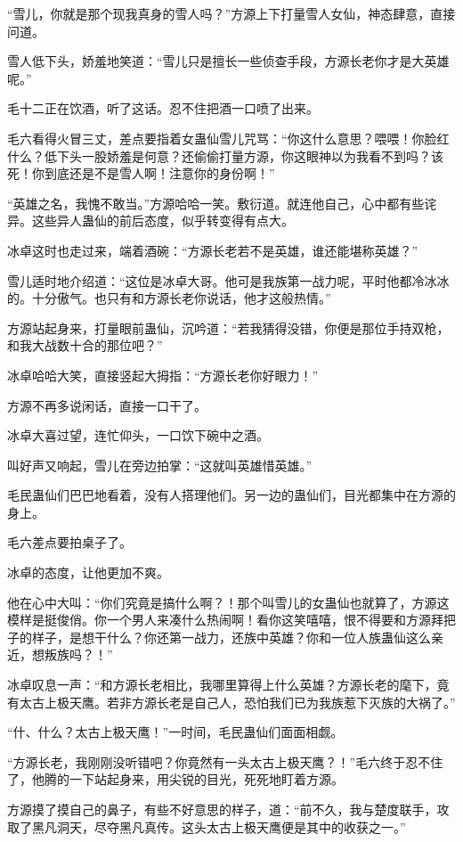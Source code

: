 \begin{this_body}
“雪儿，你就是那个现我真身的雪人吗？”方源上下打量雪人女仙，神态肆意，直接问道。

雪人低下头，娇羞地笑道：“雪儿只是擅长一些侦查手段，方源长老你才是大英雄呢。”

毛十二正在饮酒，听了这话。忍不住把酒一口喷了出来。

毛六看得火冒三丈，差点要指着女蛊仙雪儿咒骂：“你这什么意思？喂喂！你脸红什么？低下头一股娇羞是何意？还偷偷打量方源，你这眼神以为我看不到吗？该死！你到底还是不是雪人啊！注意你的身份啊！”

“英雄之名，我愧不敢当。”方源哈哈一笑。敷衍道。就连他自己，心中都有些诧异。这些异人蛊仙的前后态度，似乎转变得有点大。

冰卓这时也走过来，端着酒碗：“方源长老若不是英雄，谁还能堪称英雄？”

雪儿适时地介绍道：“这位是冰卓大哥。他可是我族第一战力呢，平时他都冷冰冰的。十分傲气。也只有和方源长老你说话，他才这般热情。”

方源站起身来，打量眼前蛊仙，沉吟道：“若我猜得没错，你便是那位手持双枪，和我大战数十合的那位吧？”

冰卓哈哈大笑，直接竖起大拇指：“方源长老你好眼力！”

方源不再多说闲话，直接一口干了。

冰卓大喜过望，连忙仰头，一口饮下碗中之酒。

叫好声又响起，雪儿在旁边拍掌：“这就叫英雄惜英雄。”

毛民蛊仙们巴巴地看着，没有人搭理他们。另一边的蛊仙们，目光都集中在方源的身上。

毛六差点要拍桌子了。

冰卓的态度，让他更加不爽。

他在心中大叫：“你们究竟是搞什么啊？！那个叫雪儿的女蛊仙也就算了，方源这模样是挺俊俏。你一个男人来凑什么热闹啊！看你这笑嘻嘻，恨不得要和方源拜把子的样子，是想干什么？你还第一战力，还族中英雄？你和一位人族蛊仙这么亲近，想叛族吗？！”

冰卓叹息一声：“和方源长老相比，我哪里算得上什么英雄？方源长老的麾下，竟有太古上极天鹰。若非方源长老是自己人，恐怕我们已为我族惹下灭族的大祸了。”

“什、什么？太古上极天鹰！”一时间，毛民蛊仙们面面相觑。

“方源长老，我刚刚没听错吧？你竟然有一头太古上极天鹰？！”毛六终于忍不住了，他腾的一下站起身来，用尖锐的目光，死死地盯着方源。

方源摸了摸自己的鼻子，有些不好意思的样子，道：“前不久，我与楚度联手，攻取了黑凡洞天，尽夺黑凡真传。这头太古上极天鹰便是其中的收获之一。”


\end{this_body}
